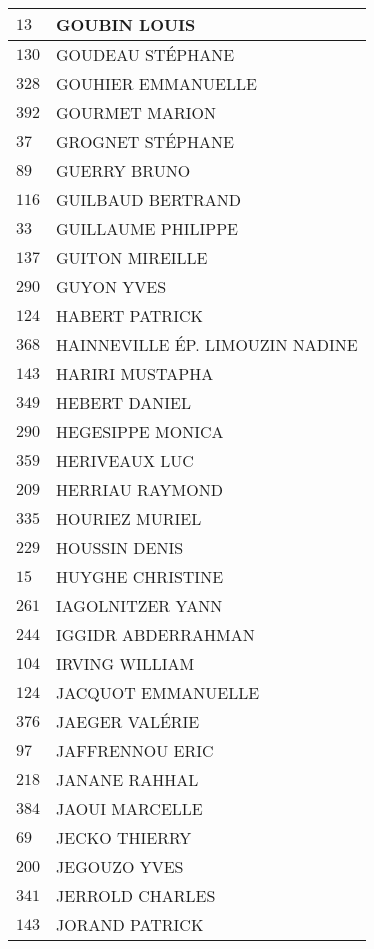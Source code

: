 \begin{xltabular}{\linewidth}{|l|X|}
    \hline
    $13$ & GOUBIN LOUIS \\
    \hline
    $130$ & GOUDEAU STÉPHANE \\
    \hline
    $328$ & GOUHIER EMMANUELLE \\
    \hline
    $392$ & GOURMET MARION \\
    \hline
    $37$ & GROGNET STÉPHANE \\
    \hline
    $89$ & GUERRY BRUNO \\
    \hline
    $116$ & GUILBAUD BERTRAND \\
    \hline
    $33$ & GUILLAUME PHILIPPE \\
    \hline
    $137$ & GUITON MIREILLE \\
    \hline
    $290$ & GUYON YVES \\
    \hline
    $124$ & HABERT PATRICK \\
    \hline
    $368$ & HAINNEVILLE ÉP. LIMOUZIN NADINE \\
    \hline
    $143$ & HARIRI MUSTAPHA \\
    \hline
    $349$ & HEBERT DANIEL \\
    \hline
    $290$ & HEGESIPPE MONICA \\
    \hline
    $359$ & HERIVEAUX LUC \\
    \hline
    $209$ & HERRIAU RAYMOND \\
    \hline
    $335$ & HOURIEZ MURIEL \\
    \hline
    $229$ & HOUSSIN DENIS \\
    \hline
    $15$ & HUYGHE CHRISTINE \\
    \hline
    $261$ & IAGOLNITZER YANN \\
    \hline
    $244$ & IGGIDR ABDERRAHMAN \\
    \hline
    $104$ & IRVING WILLIAM \\
    \hline
    $124$ & JACQUOT EMMANUELLE \\
    \hline
    $376$ & JAEGER VALÉRIE \\
    \hline
    $97$ & JAFFRENNOU ERIC \\
    \hline
    $218$ & JANANE RAHHAL \\
    \hline
    $384$ & JAOUI MARCELLE \\
    \hline
    $69$ & JECKO THIERRY \\
    \hline
    $200$ & JEGOUZO YVES \\
    \hline
    $341$ & JERROLD CHARLES \\
    \hline
    $143$ & JORAND PATRICK \\

\end{xltabular}
